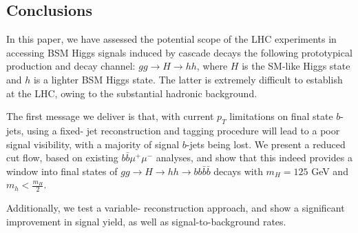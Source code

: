 \begin{table}[!h]
\begin{center}
\caption{\label{tab:signalbackground5} Final $\Sigma$ values calculated for signal and backgrounds for ${\cal L}=300$ fb$^{-1}$  upon enforcing the reduced cuts plus the mass selection criteria $|m_{bbbb}-m_H|< 20$ GeV and $|m_{bb} - m_h|< 15$ GeV for the various jet reconstruction procedures.}
\end{center}
\end{table}

\subsection{Conclusions}
In this paper, we have assessed the potential scope of the LHC
experiments in accessing BSM Higgs signals induced by cascade decays
the following prototypical production and decay channel: $gg\to H\to
hh$, where $H$ is the SM-like Higgs state and $h$ is a lighter BSM
Higgs state.
The latter is extremely difficult to establish at the LHC,
owing to the substantial hadronic background.

The first message we deliver is that, with current $p_T$ limitations on final state $b$-jets, using a fixed-\stoppingdeltar{} jet reconstruction and tagging procedure will lead to a poor signal visibility, with a majority of signal $b$-jets being lost. We present a reduced cut flow, based on existing $b\bar b\mu^+\mu^-$ analyses, and show that this indeed provides a window into final states of $gg \rightarrow H \rightarrow hh \rightarrow bb\bar{b}\bar{b}$ decays with $m_H = 125$ GeV and $m_h < \frac{m_H}{2}$. 

Additionally, we test a variable-\stoppingdeltar{} reconstruction approach, and show a significant improvement in signal yield, as well as signal-to-background rates.

